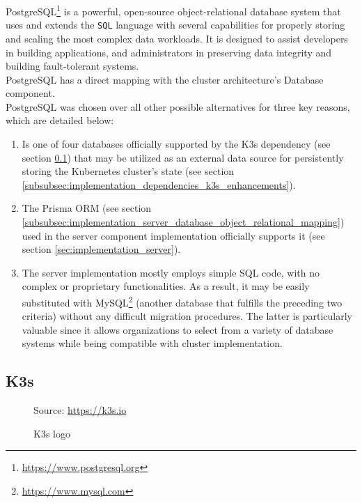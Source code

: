 PostgreSQL\footnote{\url{https://www.postgresql.org}} is a powerful, open-source
object-relational database system that uses and extends the \texttt{SQL} language
with several capabilities for properly storing and scaling the most complex data
workloads. It is designed to assist developers in building applications, and administrators
in preserving data integrity and building fault-tolerant systems. \\ %
PostgreSQL has a direct mapping with the cluster architecture's Database component.
\\ %
PostgreSQL was chosen over all other possible alternatives for three key reasons,
which are detailed below:
\begin{enumerate}
  \item Is one of four databases officially supported by the K3s dependency (see
    section \ref{subsec:implementation_dependencies_k3s}) that may be utilized as
    an external data source for persistently storing the Kubernetes cluster's state
    (see section \ref{subsubsec:implementation_dependencies_k3s_enhancements}).

  \item The Prisma ORM (see section
    \ref{subsubsec:implementation_server_database_object_relational_mapping}) used
    in the server component implementation officially supports it (see section
    \ref{sec:implementation_server}).

  \item The server implementation mostly employs simple SQL code, with no
    complex or proprietary functionalities. As a result, it may be easily
    substituted with MySQL\footnote{\url{https://www.mysql.com}} (another database
    that fulfills the preceding two criteria) without any difficult migration
    procedures. The latter is particularly valuable since it allows organizations
    to select from a variety of database systems while being compatible with cluster
    implementation.
\end{enumerate}

\subsection{K3s}
\label{subsec:implementation_dependencies_k3s}

\begin{figure} %
  \centering
  \def\stackalignment{l} %
  {\scriptsize \parbox[t]{\linewidth}{ Source: \url{https://k3s.io}} }
  \caption{K3s logo}
\end{figure}

